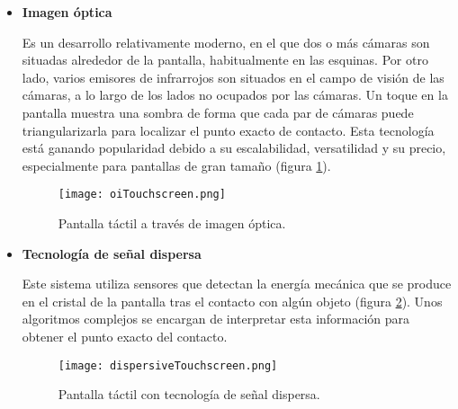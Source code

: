 \begin{itemize}
Este tipo de pantallas son muy resistentes por lo que son utilizadas 
en muchas de las aplicaciones militares que exigen una pantalla táctil.
Por otro lado, tienen el inconveniente de que son sensibles a la 
suciedad y el polvo; y pueden sufrir paralelaje\footnote{Cuando el marco
(donde se sitúan los emisores y receptores) o la pantalla se desvían de su 
posición original, por un golpe por ejemplo, el usuario notará que las 
coordenadas que selecciona no corresponden con las coordenadas que quedan
marcadas en la pantalla.}.

\item \textbf{Imagen óptica}

Es un desarrollo relativamente moderno, en el que dos o más cámaras son 
situadas alrededor de la pantalla, habitualmente en las esquinas. Por otro 
lado, varios emisores de infrarrojos son situados en el campo de visión de las
cámaras, a lo largo de los lados no ocupados por las cámaras. Un toque en la 
pantalla muestra una sombra de forma que cada par de cámaras puede 
triangularizarla para localizar el punto exacto de contacto. Esta tecnología 
está ganando popularidad debido a su escalabilidad, versatilidad y su precio, 
especialmente para pantallas de gran tamaño (figura \ref{fig:oiTouchscreen}).

  \begin{figure}[H]
    \begin{center}
      \texttt{[image: oiTouchscreen.png]}
      \caption{Pantalla táctil a través de imagen óptica.}
      \label{fig:oiTouchscreen}
    \end{center}
  \end{figure}

\item \textbf{Tecnología de señal dispersa}

Este sistema utiliza sensores que detectan la energía mecánica que se produce
en el cristal de la pantalla tras el contacto con algún objeto (figura
\ref{fig:dispersiveTouchscreen}). Unos algoritmos complejos se encargan de 
interpretar esta información para obtener el punto exacto del contacto.

  \begin{figure}[H]
    \begin{center}
      \texttt{[image: dispersiveTouchscreen.png]}
      \caption{Pantalla táctil con tecnología de señal dispersa.}
      \label{fig:dispersiveTouchscreen}
    \end{center}
  \end{figure}


\end{itemize}
